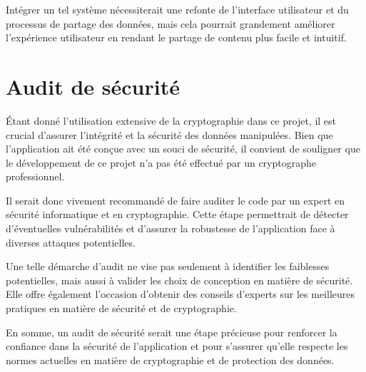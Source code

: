 Intégrer un tel système nécessiterait une refonte de l'interface utilisateur et du processus de partage des données, mais cela pourrait grandement améliorer l'expérience utilisateur en rendant le partage de contenu plus facile et intuitif.

\section{Audit de sécurité}

Étant donné l'utilisation extensive de la cryptographie dans ce projet, il est crucial d'assurer l'intégrité et la sécurité des données manipulées. Bien que l'application ait été conçue avec un souci de sécurité, il convient de souligner que le développement de ce projet n'a pas été effectué par un cryptographe professionnel.

Il serait donc vivement recommandé de faire auditer le code par un expert en sécurité informatique et en cryptographie. Cette étape permettrait de détecter d'éventuelles vulnérabilités et d'assurer la robustesse de l'application face à diverses attaques potentielles.

Une telle démarche d'audit ne vise pas seulement à identifier les faiblesses potentielles, mais aussi à valider les choix de conception en matière de sécurité. Elle offre également l'occasion d'obtenir des conseils d'experts sur les meilleures pratiques en matière de sécurité et de cryptographie.

En somme, un audit de sécurité serait une étape précieuse pour renforcer la confiance dans la sécurité de l'application et pour s'assurer qu'elle respecte les normes actuelles en matière de cryptographie et de protection des données.